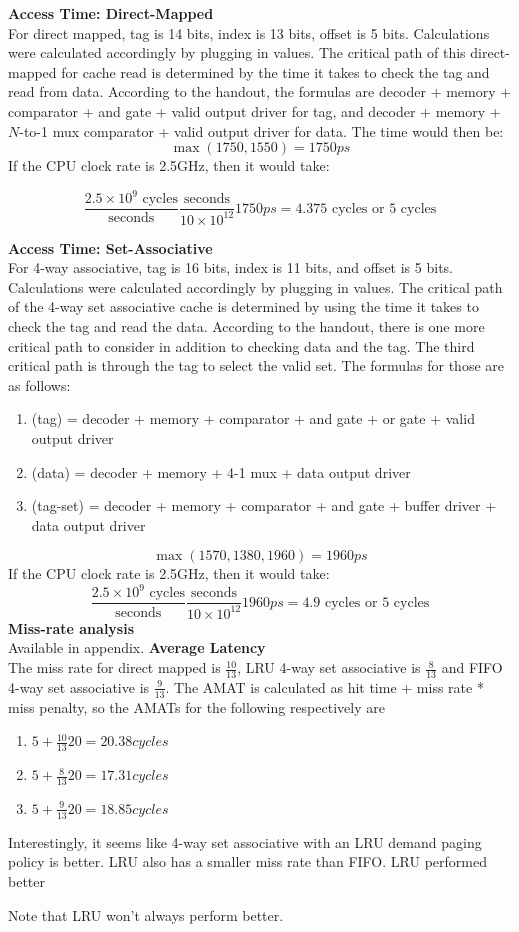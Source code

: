 \documentclass[11pt]{article}
\begin{document}
\begin{Parts}
	\Part \textbf{Access Time: Direct-Mapped} \\
	For direct mapped, tag is 14 bits, index is 13 bits, offset is 5 bits. Calculations were calculated accordingly by plugging in values. The critical path of this direct-mapped for cache read is determined by the time it takes to check the tag and read from data.
	According to the handout, the formulas are decoder + memory + comparator + and gate + valid output driver for tag, and decoder + memory + $N$-to-1 mux comparator + valid output driver for data. The time would then be:
	$$\max(1750, 1550) = 1750ps$$
	If the CPU clock rate is 2.5GHz, then it would take:

	$$\frac{2.5 \times 10^9 \text{ cycles}}{\text{seconds}}\frac{\text{seconds}}{10 \times 10^{12}} 1750ps = 4.375 \text{ cycles or } 5 \text{ cycles}$$

	\Part \textbf{Access Time: Set-Associative} \\
	For 4-way associative, tag is 16 bits, index is 11 bits, and offset is 5 bits. Calculations were calculated accordingly by plugging in values. The critical path of the 4-way set associative cache is determined by using the time it takes to check the tag and read the data.
	According to the handout, there is one more critical path to consider in addition to checking data and the tag. The third critical path is through the tag to select the valid set. The formulas for those are as follows:
	\begin{enumerate}
		\item (tag) = decoder + memory + comparator + and gate + or gate + valid output driver
		\item (data) = decoder + memory + 4-1 mux + data output driver
		\item (tag-set) = decoder + memory + comparator + and gate + buffer driver + data output driver
	\end{enumerate}
	$$\max(1570, 1380, 1960) = 1960ps$$
	If the CPU clock rate is 2.5GHz, then it would take:
	$$\frac{2.5 \times 10^9 \text{ cycles}}{\text{seconds}}\frac{\text{seconds}}{10 \times 10^{12}} 1960ps = 4.9 \text{ cycles or } 5 \text{ cycles}$$
	\Part \textbf{Miss-rate analysis} \\
	Available in appendix.
	\Part \textbf{Average Latency} \\
	The miss rate for direct mapped is $\frac{10}{13}$, LRU 4-way set associative is $\frac{8}{13}$ and FIFO 4-way set associative is $\frac{9}{13}$. The AMAT is calculated as hit time + miss rate * miss penalty, so the AMATs for the following respectively are
	\begin{enumerate}
		\item $5 + \frac{10}{13}20 = 20.38 cycles$
		\item $5 + \frac{8}{13}20 = 17.31 cycles$
		\item $5 + \frac{9}{13}20 = 18.85 cycles$
	\end{enumerate}

	Interestingly, it seems like 4-way set associative with an LRU demand paging policy is better. LRU also has a smaller miss rate than FIFO. LRU performed better

	Note that LRU won't always perform better.
\end{Parts}
\end{document}
